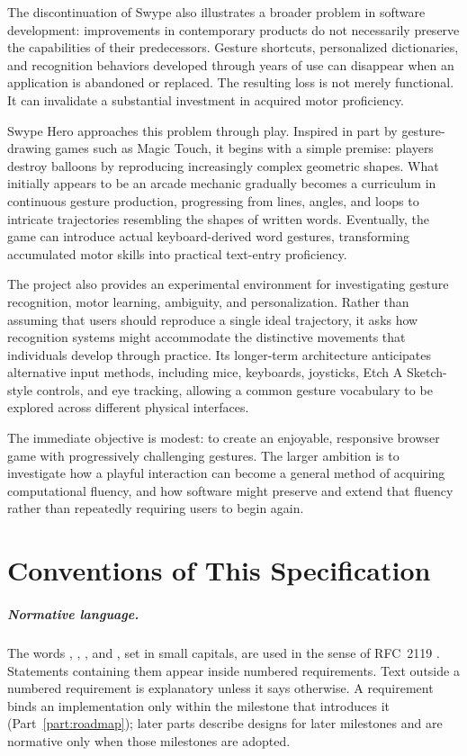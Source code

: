 The discontinuation of Swype also illustrates a broader problem in software development: improvements in contemporary products do not necessarily preserve the capabilities of their predecessors. Gesture shortcuts, personalized dictionaries, and recognition behaviors developed through years of use can disappear when an application is abandoned or replaced. The resulting loss is not merely functional. It can invalidate a substantial investment in acquired motor proficiency.

Swype Hero approaches this problem through play. Inspired in part by gesture-drawing games such as Magic Touch, it begins with a simple premise: players destroy balloons by reproducing increasingly complex geometric shapes. What initially appears to be an arcade mechanic gradually becomes a curriculum in continuous gesture production, progressing from lines, angles, and loops to intricate trajectories resembling the shapes of written words. Eventually, the game can introduce actual keyboard-derived word gestures, transforming accumulated motor skills into practical text-entry proficiency.

The project also provides an experimental environment for investigating gesture recognition, motor learning, ambiguity, and personalization. Rather than assuming that users should reproduce a single ideal trajectory, it asks how recognition systems might accommodate the distinctive movements that individuals develop through practice. Its longer-term architecture anticipates alternative input methods, including mice, keyboards, joysticks, Etch A Sketch-style controls, and eye tracking, allowing a common gesture vocabulary to be explored across different physical interfaces.

The immediate objective is modest: to create an enjoyable, responsive browser game with progressively challenging gestures. The larger ambition is to investigate how a playful interaction can become a general method of acquiring computational fluency, and how software might preserve and extend that fluency rather than repeatedly requiring users to begin again.

\chapter*{Conventions of This Specification}

\paragraph{Normative language.} The words \must, \mustnot, \should, \shouldnot{} and \may, set in small capitals, are used in the sense of RFC~2119 \cite{rfc2119}. Statements containing them appear inside numbered requirements. Text outside a numbered requirement is explanatory unless it says otherwise. A requirement binds an implementation only within the milestone that introduces it (Part~\ref{part:roadmap}); later parts describe designs for later milestones and are normative only when those milestones are adopted.

